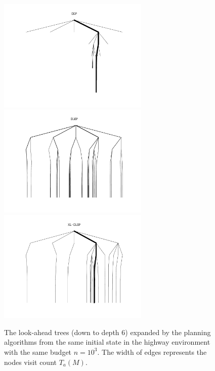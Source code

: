 \begin{figure}[pth]
	\centering
	
	\includegraphics[width=0.64\textwidth]{img/tree_OPD_svg-tex} \includegraphics[width=0.64\textwidth]{img/tree_OLOP_svg-tex}
	\includegraphics[width=0.64\textwidth]{img/tree_KL-OLOP_svg-tex}
	
	\caption{The look-ahead trees (down to depth 6) expanded by the planning algorithms from the same initial state in the highway environment with the same budget $n=10^3$. The width of edges represents the nodes visit count $T_a(M)$.}
	\label{fig:trees}
\end{figure}


